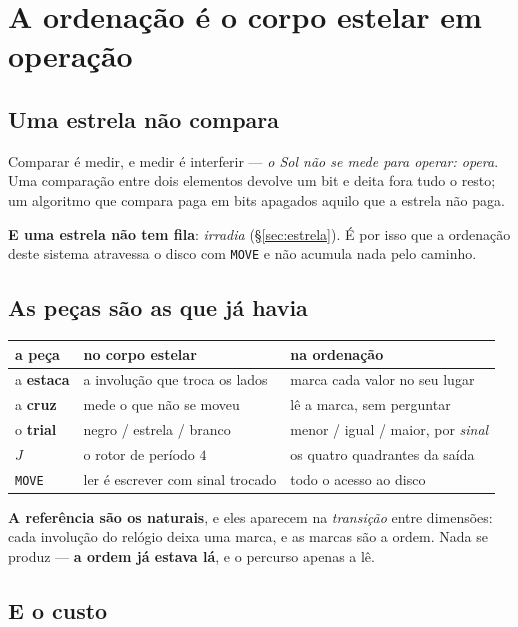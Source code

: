 \documentclass[11pt,a4paper]{article}
\newcommand{\code}[1]{\texttt{\small #1}}
\begin{document}
\section{A ordenação é o corpo estelar em operação}

\subsection*{Uma estrela não compara}

Comparar é medir, e medir é interferir --- \emph{o Sol não se mede para operar: opera}. Uma
comparação entre dois elementos devolve um bit e deita fora tudo o resto; um algoritmo que compara
paga em bits apagados aquilo que a estrela não paga.

\smallskip
\noindent \textbf{E uma estrela não tem fila}: \emph{irradia} (\S\ref{sec:estrela}). É por isso que a
ordenação deste sistema atravessa o disco com \code{MOVE} e não acumula nada pelo caminho.

\subsection*{As peças são as que já havia}

\begin{center}\small
\begin{tabular}{@{}lll@{}}
\toprule
a peça & no corpo estelar & na ordenação \\
\midrule
a \textbf{estaca} & a involução que troca os lados & marca cada valor no seu lugar \\
a \textbf{cruz} & mede o que não se moveu & lê a marca, sem perguntar \\
o \textbf{trial} & negro / estrela / branco & menor / igual / maior, por \emph{sinal} \\
$J$ & o rotor de período $4$ & os quatro quadrantes da saída \\
\code{MOVE} & ler é escrever com sinal trocado & todo o acesso ao disco \\
\bottomrule
\end{tabular}
\end{center}

\noindent \textbf{A referência são os naturais}, e eles aparecem na \emph{transição} entre
dimensões: cada involução do relógio deixa uma marca, e as marcas são a ordem. Nada se produz ---
\textbf{a ordem já estava lá}, e o percurso apenas a lê.

\subsection*{E o custo}
\end{document}
